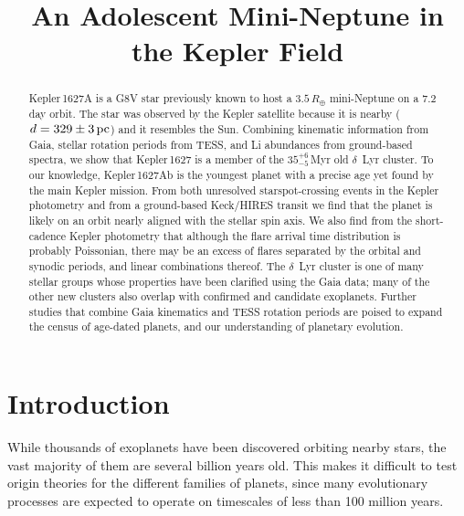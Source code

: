 \documentclass[12pt,modern,twocolumn,tighten]{aastex63}
\begin{document}
\title{
  An Adolescent Mini-Neptune in the Kepler Field
}



\begin{abstract}
  Kepler\,1627A is a G8V star previously known to host a
  $3.5\,R_\oplus$ mini-Neptune on a 7.2\,day orbit.  The star was
  observed by the Kepler satellite because it is nearby
  ($d=329\pm3\,{\rm pc}$) and it resembles the Sun.  Combining
  kinematic information from Gaia, stellar rotation periods from TESS,
  and Li abundances from ground-based spectra, we show that
  Kepler\,1627 is a member of the $35^{+6}_{-5}$\,Myr old $\delta$~Lyr
  cluster.  To our knowledge, Kepler\,1627Ab is the youngest planet
  with a precise age yet found by the main Kepler mission.  From both
  unresolved starspot-crossing events in the Kepler photometry and
  from a ground-based Keck/HIRES transit we find that the planet is
  likely on an orbit nearly aligned with the stellar spin axis.  We
  also find from the short-cadence Kepler photometry that although the
  flare arrival time distribution is probably Poissonian, there may be
  an excess of flares separated by the orbital and synodic periods,
  and linear combinations thereof.  The $\delta$~Lyr cluster is one of
  many stellar groups whose properties have been clarified using the
  Gaia data; many of the other new clusters also overlap with
  confirmed and candidate exoplanets.  Further studies that combine
  Gaia kinematics and TESS rotation periods are poised to expand the
  census of age-dated planets, and our understanding of planetary
  evolution.
\end{abstract}




\section{Introduction}

While thousands of exoplanets have been discovered orbiting nearby
stars, the vast majority of them are several billion years old.  This
makes it difficult to test origin theories for the different families
of planets, since many evolutionary processes are expected to operate
on timescales of less than 100 million years.
\end{document}
